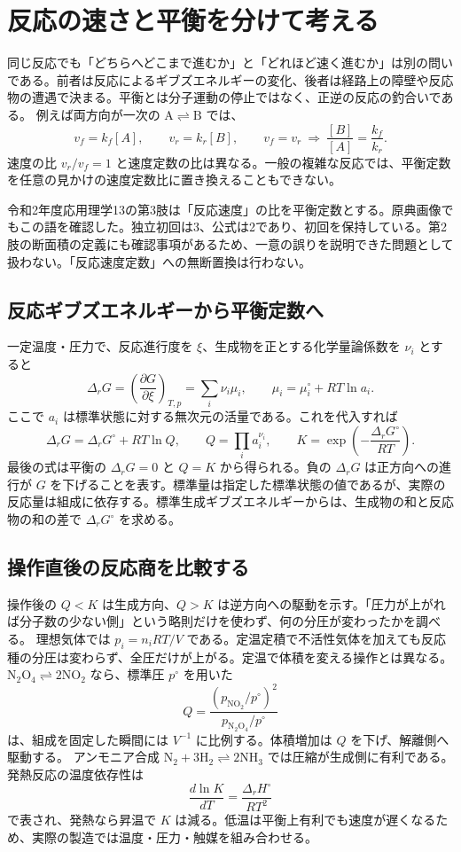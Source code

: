 \section{反応の速さと平衡を分けて考える}
\label{theory:chem_eq:rates}
同じ反応でも「どちらへどこまで進むか」と「どれほど速く進むか」は別の問いである。前者は反応によるギブズエネルギーの変化、後者は経路上の障壁や反応物の遭遇で決まる。平衡とは分子運動の停止ではなく、正逆の反応の釣合いである。
例えば両方向が一次の \(\mathrm{A\rightleftharpoons B}\) では、
\[
v_f=k_f[A],\qquad v_r=k_r[B],\qquad
v_f=v_r\ \Longrightarrow\ \frac{[B]}{[A]}=\frac{k_f}{k_r}.
\]
速度の比 \(v_r/v_f=1\) と速度定数の比は異なる。一般の複雑な反応では、平衡定数を任意の見かけの速度定数比に置き換えることもできない。
\begin{tcolorbox}[title=原典の不一致を保持する]
令和2年度応用理学13の第3肢は「反応速度」の比を平衡定数とする。原典画像でもこの語を確認した。独立初回は3、公式は2であり、初回を保持している。第2肢の断面積の定義にも確認事項があるため、一意の誤りを説明できた問題として扱わない。「反応速度定数」への無断置換は行わない。
\end{tcolorbox}

\subsection{反応ギブズエネルギーから平衡定数へ}
\label{theory:chem_eq:gibbs}
一定温度・圧力で、反応進行度を \(\xi\)、生成物を正とする化学量論係数を \(\nu_i\) とすると
\[
\Delta_rG=\left(\frac{\partial G}{\partial\xi}\right)_{T,p}
=\sum_i\nu_i\mu_i,\qquad
\mu_i=\mu_i^\circ+RT\ln a_i.
\]
ここで \(a_i\) は標準状態に対する無次元の活量である。これを代入すれば
\[
\Delta_rG=\Delta_rG^\circ+RT\ln Q,\qquad
Q=\prod_i a_i^{\nu_i},\qquad
K=\exp\!\left(-\frac{\Delta_rG^\circ}{RT}\right).
\]
最後の式は平衡の \(\Delta_rG=0\) と \(Q=K\) から得られる。負の \(\Delta_rG\) は正方向への進行が \(G\) を下げることを表す。標準量は指定した標準状態の値であるが、実際の反応量は組成に依存する。標準生成ギブズエネルギーからは、生成物の和と反応物の和の差で \(\Delta_rG^\circ\) を求める。\cite{iupac_greenbook2012}

\subsection{操作直後の反応商を比較する}
\label{theory:chem_eq:quotient}
操作後の \(Q<K\) は生成方向、\(Q>K\) は逆方向への駆動を示す。「圧力が上がれば分子数の少ない側」という略則だけを使わず、何の分圧が変わったかを調べる。
\label{theory:chem_eq:inert}
理想気体では \(p_i=n_iRT/V\) である。定温定積で不活性気体を加えても反応種の分圧は変わらず、全圧だけが上がる。定温で体積を変える操作とは異なる。
\(\mathrm{N_2O_4\rightleftharpoons2NO_2}\) なら、標準圧 \(p^\circ\) を用いた
\[
Q=\frac{(p_{\mathrm{NO_2}}/p^\circ)^2}{p_{\mathrm{N_2O_4}}/p^\circ}
\]
は、組成を固定した瞬間には \(V^{-1}\) に比例する。体積増加は \(Q\) を下げ、解離側へ駆動する。
\label{theory:chem_eq:ammonia}
アンモニア合成 \(\mathrm{N_2+3H_2\rightleftharpoons2NH_3}\) では圧縮が生成側に有利である。発熱反応の温度依存性は
\[
\frac{d\ln K}{dT}=\frac{\Delta_rH^\circ}{RT^2}
\]
で表され、発熱なら昇温で \(K\) は減る。低温は平衡上有利でも速度が遅くなるため、実際の製造では温度・圧力・触媒を組み合わせる。

